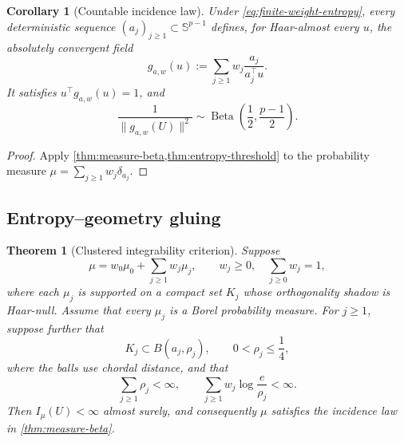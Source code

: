 \documentclass[11pt]{article}
\numberwithin{equation}{section}
\theoremstyle{thmstyleone}%
\newtheorem{theorem}{Theorem}[section]
\newtheorem{corollary}[corollary]{Corollary}
\theoremstyle{thmstyletwo}%
\let\cref\autoref
\newcommand{\sphere}{\mathbb S}
\newcommand{\Beta}{\operatorname{Beta}}
\begin{document}
\begin{corollary}[Countable incidence law]
\label{cor:countable-beta}
Under \cref{eq:finite-weight-entropy}, every deterministic sequence
\((a_j)_{j\geq1}\subset\sphere^{p-1}\) defines, for Haar-almost every \(u\),
the absolutely convergent field
\begin{equation}
  g_{a,w}(u)
  :=\sum_{j\geq1}w_j\frac{a_j}{a_j^\top u}.
  \label{eq:countable-field}
\end{equation}
It satisfies \(u^\top g_{a,w}(u)=1\), and
\begin{equation}
  \frac1{\|g_{a,w}(U)\|^2}
  \sim\Beta\!\left(\frac12,\frac{p-1}{2}\right).
  \label{eq:countable-beta}
\end{equation}
\end{corollary}

\begin{proof}
Apply \cref{thm:measure-beta,thm:entropy-threshold} to the probability
measure \(\mu=\sum_{j\geq1}w_j\delta_{a_j}\).
\end{proof}

\subsection{Entropy--geometry gluing}

\begin{theorem}[Clustered integrability criterion]
\label{thm:clustered-integrability}
Suppose
\[
  \mu=w_0\mu_0+\sum_{j\geq1}w_j\mu_j,
  \qquad
  w_j\geq0,\quad \sum_{j\geq0}w_j=1,
\]
where each \(\mu_j\) is supported on a compact set \(K_j\) whose
orthogonality shadow is Haar-null.  Assume that every \(\mu_j\) is a Borel
probability measure.  For \(j\geq1\), suppose further that
\[
  K_j\subset B(a_j,\rho_j),
  \qquad
  0<\rho_j\leq\frac14,
\]
where the balls use chordal distance, and that
\begin{equation}
  \sum_{j\geq1}\rho_j<\infty,
  \qquad
  \sum_{j\geq1}w_j\log\frac{e}{\rho_j}<\infty.
  \label{eq:clustered-summability}
\end{equation}
Then \(I_\mu(U)<\infty\) almost surely, and consequently \(\mu\) satisfies
the incidence law in \cref{thm:measure-beta}.
\end{theorem}
\end{document}

